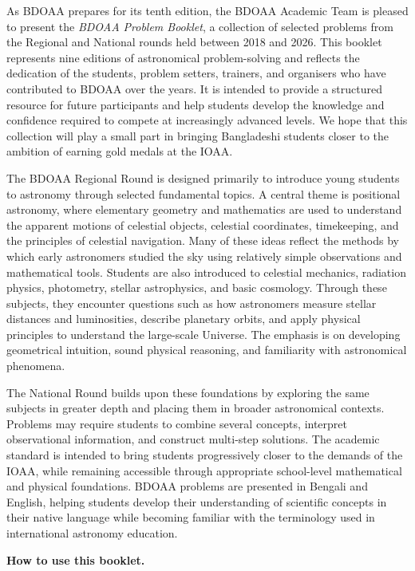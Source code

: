 \documentclass[10pt,a5paper,twoside]{article}
\newcounter{problem}[section]
\begin{document}
As BDOAA prepares for its tenth edition, the BDOAA Academic Team is pleased to present the \textit{BDOAA Problem Booklet}, a collection of selected problems from the Regional and National rounds held between 2018 and 2026. This booklet represents nine editions of astronomical problem-solving and reflects the dedication of the students, problem setters, trainers, and organisers who have contributed to BDOAA over the years. It is intended to provide a structured resource for future participants and help students develop the knowledge and confidence required to compete at increasingly advanced levels. We hope that this collection will play a small part in bringing Bangladeshi students closer to the ambition of earning gold medals at the IOAA.

The BDOAA Regional Round is designed primarily to introduce young students to astronomy through selected fundamental topics. A central theme is positional astronomy, where elementary geometry and mathematics are used to understand the apparent motions of celestial objects, celestial coordinates, timekeeping, and the principles of celestial navigation. Many of these ideas reflect the methods by which early astronomers studied the sky using relatively simple observations and mathematical tools. Students are also introduced to celestial mechanics, radiation physics, photometry, stellar astrophysics, and basic cosmology. Through these subjects, they encounter questions such as how astronomers measure stellar distances and luminosities, describe planetary orbits, and apply physical principles to understand the large-scale Universe. The emphasis is on developing geometrical intuition, sound physical reasoning, and familiarity with astronomical phenomena.

The National Round builds upon these foundations by exploring the same subjects in greater depth and placing them in broader astronomical contexts. Problems may require students to combine several concepts, interpret observational information, and construct multi-step solutions. The academic standard is intended to bring students progressively closer to the demands of the IOAA, while remaining accessible through appropriate school-level mathematical and physical foundations. BDOAA problems are presented in Bengali and English, helping students develop their understanding of scientific concepts in their native language while becoming familiar with the terminology used in international astronomy education.

\noindent\textbf{How to use this booklet.}
\end{document}
